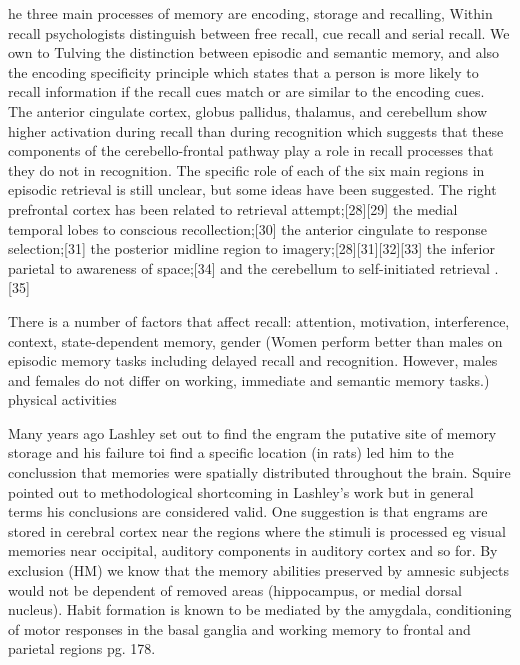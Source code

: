 \documentclass[9pt,twocolumn,twoside]{pnas-new}
\begin{document}
he three main processes of memory are encoding, storage and recalling, Within recall psychologists distinguish between free recall, cue recall and serial recall.
We own to Tulving the distinction between episodic and semantic memory, and also the encoding specificity principle which states that a person is more likely to recall information if the recall cues match or are similar to the encoding cues. 
The anterior cingulate cortex, globus pallidus, thalamus, and cerebellum show higher activation during recall than during recognition which suggests that these components of the cerebello-frontal pathway play a role in recall processes that they do not in recognition. The specific role of each of the six main regions in episodic retrieval is still unclear, but some ideas have been suggested. The right prefrontal cortex has been related to retrieval attempt;[28][29] the medial temporal lobes to conscious recollection;[30] the anterior cingulate to response selection;[31] the posterior midline region to imagery;[28][31][32][33] the inferior parietal to awareness of space;[34] and the cerebellum to self-initiated retrieval .[35]

There is a number of factors that affect recall: attention, motivation, interference, context, state-dependent memory, gender (Women perform better than males on episodic memory tasks including delayed recall and recognition. However, males and females do not differ on working, immediate and semantic memory tasks.) physical activities


Many years ago Lashley \cite{lashley1929brain} set out to find the engram the putative site of memory storage and his failure toi find a specific location (in rats) led him to the conclussion that memories were spatially distributed  throughout the brain. Squire \cite{squire2004memory} pointed out to methodological shortcoming in Lashley's work but in general terms his conclusions are considered valid.
One suggestion is that engrams are stored in cerebral cortex near the regions where the stimuli is processed eg visual memories near occipital, auditory components in auditory cortex and so for. 
By exclusion (HM) we know that the memory abilities preserved by amnesic subjects would not be dependent of removed areas (hippocampus, or medial dorsal nucleus). Habit formation is known to be mediated by the amygdala, conditioning of motor responses in the basal ganglia and working memory to frontal and parietal regions \cite{margolin1992cognitive} pg. 178. 
\end{document}
